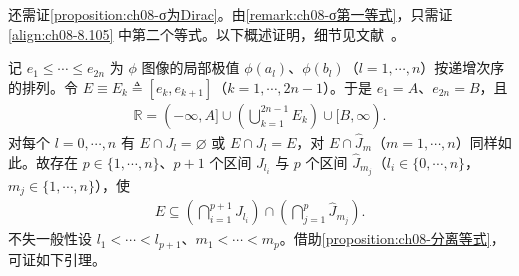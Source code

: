 \documentclass[../../main.tex]{subfiles}%
\begin{document}
还需证\cref{proposition:ch08-σ为Dirac}。由\cref{remark:ch08-σ第一等式}，只需证\eqref{align:ch08-8.105} 中第二个等式。以下概述证明，细节见文献~\cite{ref30}。

记 $e_1\leqslant\cdots\leqslant e_{2n}$ 为 $\phi$ 图像的局部极值 $\phi(a_l)$、$\phi(b_l)$（$l=1,\cdots ,n$）按递增次序的排列。令 $E\equiv E_k\triangleq[e_k,e_{k+1}]$（$k=1,\cdots ,2n-1$）。于是 $e_1=A$、$e_{2n}=B$，且
\begin{align*}
\mathbb{R}=(-\infty,A]\cup\left(\bigcup_{k=1}^{2n-1}E_k\right)\cup[B,\infty).
\end{align*}
对每个 $l=0,\cdots ,n$ 有 $E\cap J_l=\varnothing$ 或 $E\cap J_l=E$，对 $E\cap\widehat J_m$（$m=1,\cdots ,n$）同样如此。故存在 $p\in\{1,\cdots ,n\}$、$p+1$ 个区间 $J_{l_i}$ 与 $p$ 个区间 $\widehat J_{m_j}$（$l_i\in\{0,\cdots ,n\}$，$m_j\in\{1,\cdots ,n\}$），使
\begin{align}
E\subseteq\left(\bigcap_{i=1}^{p+1}J_{l_i}\right)\cap\left(\bigcap_{j=1}^{p}\widehat J_{m_j}\right). \label{align:ch08-8.112}
\end{align}
不失一般性设 $l_1<\cdots <l_{p+1}$、$m_1<\cdots <m_p$。借助\cref{proposition:ch08-分离等式}，可证如下引理。
\end{document}
